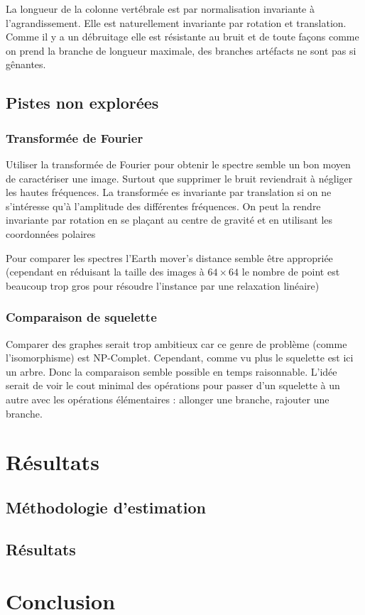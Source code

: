 \documentclass{article}
\theoremstyle{definition}
\begin{document}
      La longueur de la colonne vertébrale est par normalisation invariante à l'agrandissement. Elle est naturellement invariante par rotation et translation. Comme il y a un débruitage elle est résistante au bruit et de toute façons comme on prend la branche de longueur maximale, des branches artéfacts ne sont pas si gênantes.
    
    \subsection{Pistes non explorées}
        \subsubsection{Transformée de Fourier} 
        
        Utiliser la transformée de Fourier pour obtenir le spectre semble un bon moyen de caractériser une image. Surtout que supprimer le bruit reviendrait à négliger les hautes fréquences. La transformée es invariante par translation si on ne s'intéresse qu'à l'amplitude des différentes fréquences. On peut la rendre invariante par rotation en se plaçant au centre de gravité et en utilisant les coordonnées polaires
        
        Pour comparer les spectres l'Earth mover's distance semble être appropriée (cependant en réduisant la taille des images à $64 \times 64$ le nombre de point est beaucoup trop gros pour résoudre l'instance par une relaxation linéaire)
        
        \subsubsection{Comparaison de squelette}  %
        
        Comparer des graphes serait trop ambitieux car ce genre de problème (comme l'isomorphisme) est NP-Complet. Cependant, comme vu plus le squelette est ici un arbre. Donc la comparaison semble possible en temps raisonnable. L'idée serait de voir le cout minimal des opérations pour passer d'un squelette à un autre avec les opérations élémentaires : allonger une branche, rajouter une branche.
  
  \section{Résultats} 
  
    \subsection{Méthodologie d'estimation}  %
    
    \subsection{Résultats} %
  
  \section{Conclusion}
  
\end{document}
